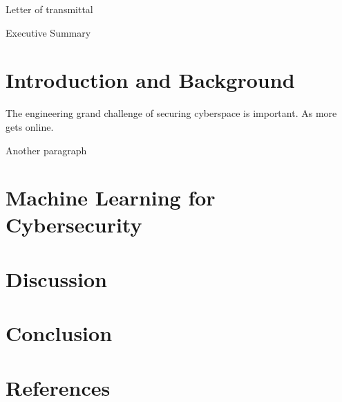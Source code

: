 \documentclass{article}
\begin{document}
    Letter of transmittal

    \pagebreak

    

    Executive Summary

    \pagebreak

    \tableofcontents

    \pagebreak

    \section{Introduction and Background}
    The engineering grand challenge of securing cyberspace is important.
    As more gets online.

    Another paragraph

    \section{Machine Learning for Cybersecurity}

    \section{Discussion}

    \pagebreak

    \section{Conclusion}

    \pagebreak

    \section{References}
\end{document}
